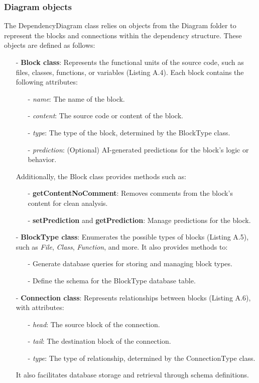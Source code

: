 \subsubsection{Diagram objects}


The DependencyDiagram class relies on objects from the Diagram folder to represent the blocks and connections within the dependency structure. These objects are defined as follows:

\begin{itemize}
    \item[-] \textbf{Block class}: Represents the functional units of the source code, such as files, classes, functions, or variables (Listing A.4). Each block contains the following attributes:
    \begin{itemize}
        \item[-] \textit{name}: The name of the block.
        \item[-] \textit{content}: The source code or content of the block.
        \item[-] \textit{type}: The type of the block, determined by the BlockType class.
        \item[-] \textit{prediction}: (Optional) AI-generated predictions for the block's logic or behavior.
    \end{itemize}
    Additionally, the Block class provides methods such as:
    \begin{itemize}
        \item[-] \textbf{getContentNoComment}: Removes comments from the block's content for clean analysis.
        \item[-] \textbf{setPrediction} and \textbf{getPrediction}: Manage predictions for the block.
    \end{itemize}

    \item[-] \textbf{BlockType class}: Enumerates the possible types of blocks (Listing A.5), such as \textit{File}, \textit{Class}, \textit{Function}, and more. It also provides methods to:
    \begin{itemize}
        \item[-] Generate database queries for storing and managing block types.
        \item[-] Define the schema for the BlockType database table.
    \end{itemize}

    \item[-] \textbf{Connection class}: Represents relationships between blocks (Listing A.6), with attributes:
    \begin{itemize}
        \item[-] \textit{head}: The source block of the connection.
        \item[-] \textit{tail}: The destination block of the connection.
        \item[-] \textit{type}: The type of relationship, determined by the ConnectionType class.
    \end{itemize}
    It also facilitates database storage and retrieval through schema definitions.


\end{itemize}
